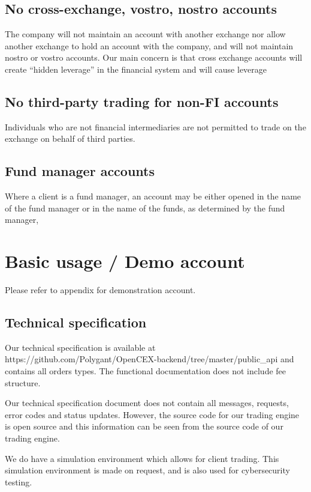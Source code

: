 \subsection{No cross-exchange, vostro, nostro accounts}
The company will not maintain an account with another exchange nor
allow another exchange to hold an account with the company, and will
not maintain nostro or vostro accounts.  Our main concern is that
cross exchange accounts will create ``hidden leverage'' in the
financial system and will cause leverage

\subsection{No third-party trading for non-FI accounts}
Individuals who are not financial intermediaries are not permitted to
trade on the exchange on behalf of third parties.

\subsection{Fund manager accounts}
Where a client is a fund manager, an account may be either opened in the name of
the fund manager or in the name of the funds, as determined by the
fund manager,

\section{Basic usage / Demo account}
Please refer to appendix for demonstration account.

\subsection{Technical specification}
Our technical specification is available at
https://github.com/Polygant/OpenCEX-backend/tree/master/public\_api
and contains all orders types.  The functional documentation does not
include fee structure.

Our technical specification document does not contain all messages,
requests, error codes and status updates.  However, the source code
for our trading engine is open source and this information can be seen
from the source code of our trading engine.

We do have a simulation environment which allows for client
trading.  This simulation environment is made on request, and is also
used for cybersecurity testing.

